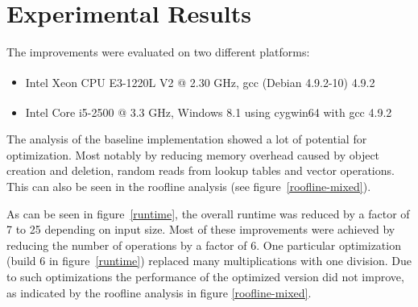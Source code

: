 \section{Experimental Results}\label{sec:results}

 The improvements were evaluated on two different platforms:
\begin{itemize}
\item Intel\textsuperscript{\textregistered} Xeon CPU E3-1220L V2 @ 2.30 GHz, gcc (Debian 4.9.2-10) 4.9.2
\item Intel\textsuperscript{\textregistered} Core i5-2500 @ 3.3 GHz, Windows 8.1 using cygwin64 with gcc 4.9.2
\end{itemize}

The analysis of the baseline implementation showed a lot of potential for optimization. Most notably by reducing memory overhead caused by object creation and deletion, random reads from lookup tables and vector operations. This can also be seen in the roofline analysis \cite{Ofenbeck:14} (see figure~\ref{roofline-mixed}).

As can be seen in figure~\ref{runtime}, the overall runtime was reduced by a factor of 7 to 25 depending on input size. Most of these improvements were achieved by reducing the number of operations by a factor of 6. One particular optimization (build 6 in figure~\ref{runtime}) replaced many multiplications with one division. Due to such optimizations the performance of the optimized version did not improve, as indicated by the roofline analysis in figure \ref{roofline-mixed}.

